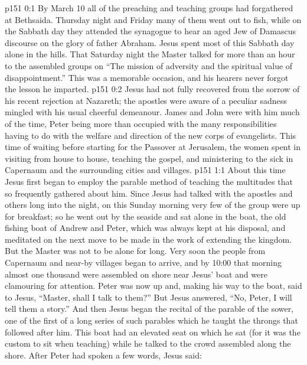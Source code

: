 \author{Midwayer Commission}
\vs p151 0:1 By March 10 all of the preaching and teaching groups had forgathered at Bethsaida. Thursday night and Friday many of them went out to fish, while on the Sabbath day they attended the synagogue to hear an aged Jew of Damascus discourse on the glory of father Abraham. Jesus spent most of this Sabbath day alone in the hills. That Saturday night the Master talked for more than an hour to the assembled groups on “The mission of adversity and the spiritual value of disappointment.” This was a memorable occasion, and his hearers never forgot the lesson he imparted.
\vs p151 0:2 Jesus had not fully recovered from the sorrow of his recent rejection at Nazareth; the apostles were aware of a peculiar sadness mingled with his usual cheerful demeanour. James and John were with him much of the time, Peter being more than occupied with the many responsibilities having to do with the welfare and direction of the new corps of evangelists. This time of waiting before starting for the Passover at Jerusalem, the women spent in visiting from house to house, teaching the gospel, and ministering to the sick in Capernaum and the surrounding cities and villages.
\vs p151 1:1 About this time Jesus first began to employ the parable method of teaching the multitudes that so frequently gathered about him. Since Jesus had talked with the apostles and others long into the night, on this Sunday morning very few of the group were up for breakfast; so he went out by the seaside and sat alone in the boat, the old fishing boat of Andrew and Peter, which was always kept at his disposal, and meditated on the next move to be made in the work of extending the kingdom. But the Master was not to be alone for long. Very soon the people from Capernaum and near\hyp{}by villages began to arrive, and by 10:00 that morning almost one thousand were assembled on shore near Jesus’ boat and were clamouring for attention. Peter was now up and, making his way to the boat, said to Jesus, “Master, shall I talk to them?” But Jesus answered, “No, Peter, I will tell them a story.” And then Jesus began the recital of the parable of the sower, one of the first of a long series of such parables which he taught the throngs that followed after him. This boat had an elevated seat on which he sat (for it was the custom to sit when teaching) while he talked to the crowd assembled along the shore. After Peter had spoken a few words, Jesus said:
